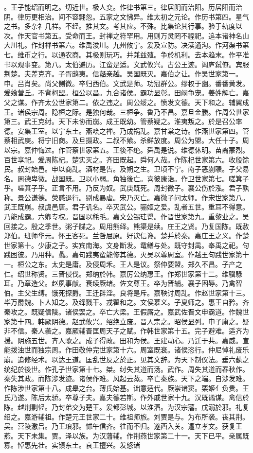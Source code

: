 \documentclass{zhvt-classic}
\begin{document}
。王子能绍而明之。切近世。极人变。作律书第三。律居阴而治阳。历居阳而治阴。律历更相治。间不容翲忽。五家之文怫异。维太初之元论。作历书第四。星气之书。多杂礻几祥。不经。推其文。考其应。不殊。比集论其行事。验于轨度以次。作天官书第五。受命而王。封禅之符罕用。用则万灵罔不禋祀。追本诸神名山大川礼。作封禅书第六。维禹浚川。九州攸宁。爰及宣防。决渎通沟。作河渠书第七。维币之行。以通农商。其极则玩巧。并兼兹殖。争於机利。去本趋末。作平准书以观事变。第八。太伯避历。江蛮是适。文武攸兴。古公王迹。阖庐弑僚。宾服荆楚。夫差克齐。子胥鸱夷。信嚭亲越。吴国既灭。嘉伯之让。作吴世家第一。申。吕肖矣。尚父侧微。卒归西伯。文武是师。功冠群公。缪权于幽。番番黄发。爰飨营丘。不背柯盟。桓公以昌。九合诸侯。霸功显彰。田阚争宠。姜姓解亡。嘉父之谋。作齐太公世家第二。依之违之。周公绥之。愤发文德。天下和之。辅翼成王。诸侯宗周。隐桓之际。是独何哉。三桓争。鲁乃不昌。嘉旦金縢。作周公世家第三。武王克纣。天下未协而崩。成王既幼。管蔡疑之。淮夷叛之。於是召公率德。安集王室。以宁东土。燕哙之禅。乃成祸乱。嘉甘棠之诗。作燕世家第四。管蔡相武庚。将宁旧商。及旦摄政。二叔不飨。杀鲜放度。周公为盟。大任十子。周以宗。嘉仲悔过。作管蔡世家第五。王後不绝。舜禹是说。维德休明。苗裔蒙烈。百世享祀。爰周陈杞。楚实灭之。齐田既起。舜何人哉。作陈杞世家第六。收殷馀民。叔封始邑。申以商乱。酒材是告。及朔之生。卫顷不宁。南子恶蒯聩。子父易名。周德卑微。战国既。卫以小弱。角独後亡。喜彼康诰。作卫世家第七。嗟箕子乎。嗟箕子乎。正言不用。乃反为奴。武庚既死。周封微子。襄公伤於泓。君子孰称。景公谦德。荧惑退行。剔成暴虐。宋乃灭亡。嘉微子问太师。作宋世家第八。武王既崩。叔虞邑唐。君子讥名。卒灭武公。骊姬之爱。乱者五世。重耳不得意。乃能成霸。六卿专权。晋国以秏毛。嘉文公锡珪鬯。作晋世家第九。重黎业之。吴回接之。殷之季世。粥子牒之。周用熊绎。熊渠是续。庄王之贤。乃复国陈。既赦郑伯。班师华元。怀王客死。兰咎屈原。好谀信谗。楚并於秦。嘉庄王之义。作楚世家第十。少康之子。实宾南海。文身断发。鼋鳝与处。既守封禺。奉禹之祀。句践困彼。乃用种。蠡。嘉句践夷蛮能修其德。灭吴以尊周室。作越王句践世家第十一。桓公之东。太史是庸。及侵周禾。王人是议。祭仲要盟。郑久不昌。子产之仁。绍世称贤。三晋侵伐。郑纳於韩。嘉厉公纳惠王。作郑世家第十二。维骥騄耳。乃章造父。赵夙事献。衰续厥绪。佐文尊王。卒为晋辅。襄子困辱。乃禽智伯。主父生缚。饿死探爵。王迁辟淫。良将是斥。嘉鞅讨周乱。作赵世家第十三。毕万爵魏。卜人知之。及绛戮干。戎翟和之。文侯慕义。子夏师之。惠王自矜。齐秦攻之。既疑信陵。诸侯罢之。卒亡大梁。王假厮之。嘉武佐晋文申霸道。作魏世家第十四。韩厥阴德。赵武攸兴。绍绝立废。晋人宗之。昭侯显列。申子庸之。疑非不信。秦人袭之。嘉厥辅晋匡周天子之赋。作韩世家第十五。完子避难。适齐为援。阴施五世。齐人歌之。成子得政。田和为侯。王建动心。乃迁于共。嘉威。宣能拨浊世而独宗周。作田敬仲完世家第十六。周室既衰。诸侯恣行。仲尼悼礼废乐崩。追修经术。以达王道。匡乱世反之於正。见其文辞。为天下制仪法。垂六蓺之统纪於後世。作孔子世家第十七。桀。纣失其道而汤。武作。周失其道而春秋作。秦失其政。而陈涉发迹。诸侯作难。风起云蒸。卒亡秦族。天下之端。自涉发难。作陈涉世家第十八。成皋之台。薄氏始基。诎意适代。厥崇诸窦。栗姬亻负贵。王氏乃遂。陈后太骄。卒尊子夫。嘉夫德若斯。作外戚世家十九。汉既谲谋。禽信於陈。越荆剽轻。乃封弟交为楚王。爰都彭城。以淮泗。为汉宗藩。戊溺於邪。礼复绍之。嘉游辅祖。作楚元王世家二十。维祖师旅。刘贾是与。为布所袭。丧其荆。吴。营陵激吕。乃王琅邪。怵午信齐。往而不归。遂西入关。遭立孝文。获复王燕。天下未集。贾。泽以族。为汉藩辅。作荆燕世家第二十一。天下已平。亲属既寡。悼惠先壮。实镇东土。哀王擅兴。发怒诸
\end{document}
